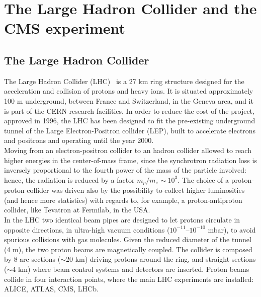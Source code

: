 \chapter{The Large Hadron Collider and the CMS experiment}
\label{chap:LHC_CMS}


\section{The Large Hadron Collider}
The Large Hadron Collider (LHC)~\cite{Evans:2008zzb} is a 27 km ring structure designed for the acceleration and collision of protons and heavy ions. It is situated approximately 100 m underground, between France and Switzerland, in the Geneva area, and it is part of the CERN %
research facilities. In order to reduce the cost of the project, approved in 1996, the LHC has been designed to fit the pre-existing underground tunnel of the Large Electron-Positron collider (LEP), built to accelerate electrons and positrons and operating until the year 2000.\\
Moving from an electron-positron collider to an hadron collider allowed to reach higher energies in the center-of-mass frame, since the synchrotron radiation loss is inversely proportional to the fourth power of the mass of the particle involved: hence, the radiation is reduced by a factor $m_p/m_e$ $\sim~10^3$. The choice of a proton-proton collider was driven also by the possibility to collect higher luminosities (and hence more statistics) with regards to, for example, a proton-antiproton collider, like Tevatron at Fermilab, in the USA.\\
In the LHC two identical beam pipes are designed to let protons circulate in opposite directions, in ultra-high vacuum conditions ($10^{-11}$--$10^{-10}$ mbar), to avoid spurious collisions with gas molecules. Given the reduced diameter of the tunnel (4 m), the two proton beams are magnetically coupled. The collider is composed by 8 arc sections ($\sim$20 km) driving protons around the ring, and straight sections ($\sim$4 km) where beam control systems and detectors are inserted. Proton beams collide in four interaction points, where the main LHC experiments are installed: ALICE, ATLAS, CMS, LHCb.

